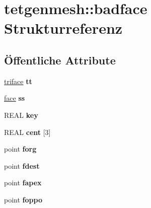 \hypertarget{structtetgenmesh_1_1badface}{\section{tetgenmesh\-:\-:badface Strukturreferenz}
\label{structtetgenmesh_1_1badface}
}
\subsection*{Öffentliche Attribute}
\begin{DoxyCompactItemize}
\item 
\hypertarget{structtetgenmesh_1_1badface_a01d24569e6058b3dae1a31e0638b849c}{\hyperlink{classtetgenmesh_1_1triface}{triface} {\bfseries tt}}\label{structtetgenmesh_1_1badface_a01d24569e6058b3dae1a31e0638b849c}

\item 
\hypertarget{structtetgenmesh_1_1badface_ace098878b5e89ec387c959d8acd0153d}{\hyperlink{classtetgenmesh_1_1face}{face} {\bfseries ss}}\label{structtetgenmesh_1_1badface_ace098878b5e89ec387c959d8acd0153d}

\item 
\hypertarget{structtetgenmesh_1_1badface_ac94189eb4b728abd589597c89db9a1d7}{R\-E\-A\-L {\bfseries key}}\label{structtetgenmesh_1_1badface_ac94189eb4b728abd589597c89db9a1d7}

\item 
\hypertarget{structtetgenmesh_1_1badface_a9442ab7cb1de6c741287711db1689426}{R\-E\-A\-L {\bfseries cent} \mbox{[}3\mbox{]}}\label{structtetgenmesh_1_1badface_a9442ab7cb1de6c741287711db1689426}

\item 
\hypertarget{structtetgenmesh_1_1badface_a620b94f643bafaa7a4dbfeba7063a445}{point {\bfseries forg}}\label{structtetgenmesh_1_1badface_a620b94f643bafaa7a4dbfeba7063a445}

\item 
\hypertarget{structtetgenmesh_1_1badface_a8e010478b28c997ad9b441d05df47695}{point {\bfseries fdest}}\label{structtetgenmesh_1_1badface_a8e010478b28c997ad9b441d05df47695}

\item 
\hypertarget{structtetgenmesh_1_1badface_a617348221ce387b323575110a5c79627}{point {\bfseries fapex}}\label{structtetgenmesh_1_1badface_a617348221ce387b323575110a5c79627}

\item 
\hypertarget{structtetgenmesh_1_1badface_a8e9966e480c210ac83ab0a4c221a7000}{point {\bfseries foppo}}\label{structtetgenmesh_1_1badface_a8e9966e480c210ac83ab0a4c221a7000}


\end{DoxyCompactItemize}
